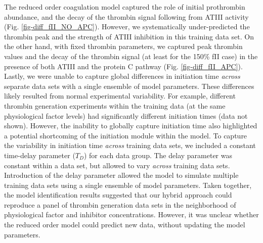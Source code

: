 \documentclass[processes,article,received,moreauthors,pdftex,12pt,a4paper]{mdpi}
\begin{document}
The reduced order coagulation model captured the role of initial prothrombin abundance, and the decay of the thrombin signal following from ATIII activity (Fig. \ref{fig-diff_fII_NO_APC}).
However, we systematically under-predicted the thrombin peak and the strength of ATIII inhibition in this training data set.
On the other hand, with fixed thrombin parameters, we captured peak thrombin values and the decay of the thrombin signal (at least for the 150\% fII case) in the presence
of both ATIII and the protein C pathway (Fig. \ref{fig-diff_fII_APC}). Lastly, we were unable to capture global differences in initiation time \textit{across} separate data 
sets with a single ensemble of model parameters. These differences likely resulted from normal experimental variability.
For example, different thrombin generation experiments within the 
training data (at the same physiological factor levels) had significantly different initiation times (data not shown). 
However, the inability to globally capture initiation time also highlighted a potential shortcoming of the initiation module within the model. 
To capture the variability in initiation time \textit{across} training data sets, we included a constant time-delay parameter ($T_{D}$) for each data group.
The delay parameter was constant within a data set, but allowed to vary \textit{across} training data sets. 
Introduction of the delay parameter allowed the model to simulate multiple training data sets using a single ensemble of model parameters.
Taken together, the model identification results suggested 
that our hybrid approach could reproduce a panel of thrombin generation data sets in the neighborhood of physiological factor and inhibitor concentrations.
However, it was unclear whether the reduced order model could predict new data, without updating the model parameters.
\end{document}
